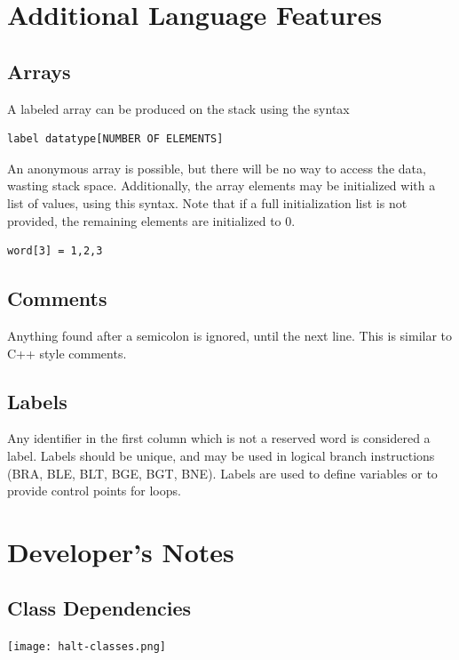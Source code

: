 \documentclass[10pt,fullpage]{article}
\begin{document}
\section*{Additional Language Features}

\subsection*{Arrays}
A labeled array can be produced on the stack using the syntax
\begin{verbatim}label datatype[NUMBER OF ELEMENTS]\end{verbatim}
An anonymous array is possible, but there will be no way to access
the data, wasting stack space. Additionally, the array elements may
be initialized with a list of values, using this syntax. Note that
if a full initialization list is not provided, the remaining
elements are initialized to 0.
\begin{verbatim}word[3] = 1,2,3\end{verbatim}

\subsection*{Comments}
Anything found after a semicolon is ignored, until the next line.
This is similar to C++ style comments.

\subsection*{Labels}
Any identifier in the first column which is not a reserved word is
considered a label. Labels should be unique, and may be used in
logical branch instructions (BRA, BLE, BLT, BGE, BGT, BNE). Labels
are used to define variables or to provide control points for loops.

\section*{Developer's Notes}
\subsection*{Class Dependencies}
\texttt{[image: halt-classes.png]}
\end{document}

